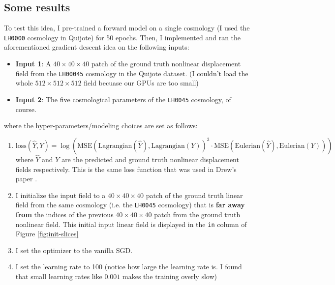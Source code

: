 \documentclass{article}
\begin{document}
\subsection{Some results}

To test this idea, I pre-trained a forward model on a single cosmology (I used the \texttt{LH0000} cosmology in Quijote) for 50 epochs. Then, I implemented and ran the aforementioned gradient descent idea on the following inputs:
\begin{itemize}
\setlength\itemsep{-1em}
    \item \textbf{Input 1}: A $40 \times 40 \times 40$ patch of the ground truth nonlinear displacement field from the \texttt{LH00045} cosmology in the Quijote dataset. (I couldn't load the whole $512 \times 512 \times 512$ field becuase our GPUs are too small) \\
    \item \textbf{Input 2}: The five cosmological parameters of the \texttt{LH0045} cosmology, of course.
\end{itemize}
where the hyper-parameters/modeling choices are set as follows:
\begin{enumerate}
\setlength\itemsep{-1em}
    \item $\mbox{loss}(\hat{Y}, Y) = \log \left( \mbox{MSE} \left( \mbox{Lagrangian}(\hat{Y}), \mbox{Lagrangian}(Y) \right)^3 \cdot \mbox{MSE} \left( \mbox{Eulerian}(\hat{Y}), \mbox{Eulerian}(Y) \right) \right)$ where $\hat{Y}$ and $Y$ are the predicted and ground truth nonlinear displacement fields respectively. This is the same loss function that was used in Drew's paper \cite{emulator}. \\
    \item I initialize the input field to a $40 \times 40 \times 40$ patch of the ground truth linear field from the same cosmology (i.e. the \texttt{LH0045} cosmology) that is \textbf{far away from} the indices of the previous $40 \times 40 \times 40$ patch from the ground truth nonlinear field. This initial input linear field is displayed in the \texttt{in} column of Figure \ref{fig:init-slices} \\
    \item I set the optimizer to the vanilla SGD. \\
    \item I set the learning rate to 100 (notice how large the learning rate is. I found that small learning rates like $0.001$ makes the training overly slow)
\end{enumerate}
\end{document}
